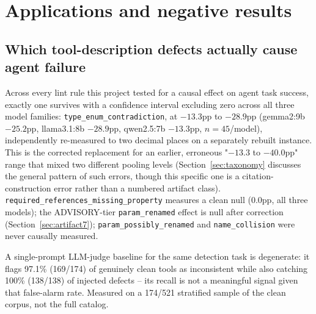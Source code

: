 \documentclass[11pt]{article}
\begin{document}
\section{Applications and negative results}
\label{sec:applications}

\subsection{Which tool-description defects actually cause agent failure}
Across every lint rule this project tested for a causal effect on agent task success, exactly one
survives with a confidence interval excluding zero across all three model families:
\texttt{type\_enum\_contradiction}, at $-13.3$pp to $-28.9$pp (gemma2:9b $-25.2$pp, llama3.1:8b
$-28.9$pp, qwen2.5:7b $-13.3$pp, $n=45$/model), independently re-measured to two decimal places on
a separately rebuilt instance.
This is the corrected replacement for an earlier, erroneous "$-13.3$ to $-40.0$pp" range that
mixed two different pooling levels
(Section~\ref{sec:taxonomy} discusses the general pattern of
such errors, though this specific one is a citation-construction error rather than a numbered
artifact class). \texttt{required\_\allowbreak references\_\allowbreak missing\_\allowbreak property}
measures a clean null (0.0pp,
all three models); the ADVISORY-tier \texttt{param\_renamed} effect is null after correction
(Section~\ref{sec:artifact7}); \texttt{param\_possibly\_renamed} and \texttt{name\_collision} were
never causally measured.

A single-prompt LLM-judge baseline for the same detection task is degenerate: it flags 97.1\%
(169/174) of genuinely clean tools as inconsistent while also catching 100\% (138/138) of injected
defects -- its recall is not a meaningful signal given that false-alarm rate. Measured on a 174/521
stratified sample of the clean corpus, not the full catalog.
\end{document}
